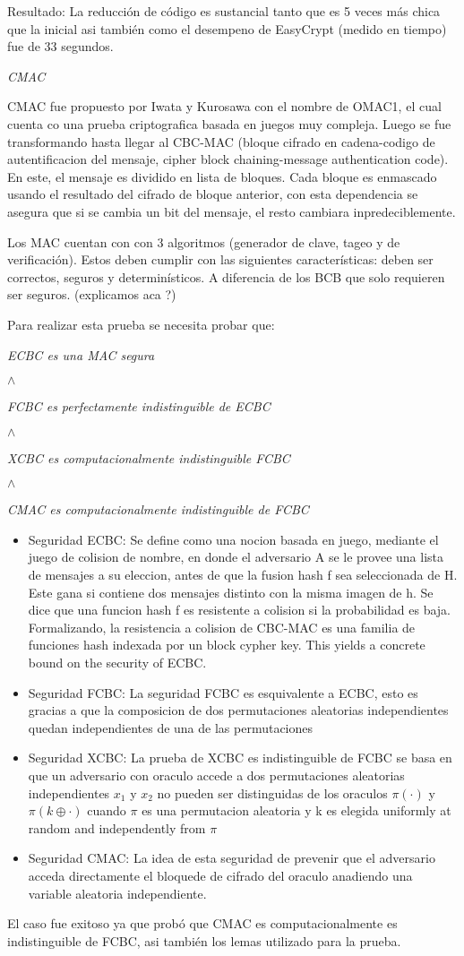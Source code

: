\documentclass[runningheads,a4paper]{llncs}
\begin{document}
Resultado: La reducción de código es sustancial tanto que es 5 veces más chica que la inicial asi también como el desempeno de EasyCrypt (medido en tiempo) fue de 33 segundos.\cite{article3}



\centerline{\emph{CMAC}}
\cite{article5}
CMAC fue propuesto por Iwata y Kurosawa con el nombre de OMAC1, el cual cuenta co una prueba criptografica basada en juegos muy compleja. Luego se fue transformando hasta llegar al CBC-MAC (bloque cifrado en cadena-codigo de autentificacion del mensaje, cipher block chaining-message authentication code). En este, el mensaje es dividido en lista de bloques. Cada bloque es enmascado usando el resultado del cifrado de bloque anterior, con esta dependencia se asegura que si se cambia un bit  del mensaje, el resto cambiara inpredeciblemente.

Los MAC cuentan con con 3 algoritmos (generador de clave, tageo y de verificación). Estos deben cumplir con las siguientes características: deben ser correctos, seguros y determinísticos. A diferencia de los BCB que solo requieren ser seguros. (explicamos aca ?)

Para realizar esta prueba se necesita probar que:

\centerline{\emph{ECBC es una MAC segura}}
\centerline{$\land$}
\centerline{\emph{FCBC es perfectamente indistinguible de ECBC}}
\centerline{$\land$}
\centerline{\emph{XCBC es computacionalmente indistinguible FCBC}}
\centerline{$\land$}
\centerline{\emph{CMAC es computacionalmente indistinguible de FCBC}}

\begin{itemize}
	\item Seguridad ECBC: Se define como una nocion basada en juego, mediante el juego de colision de nombre, en donde el adversario A se le provee una lista de mensajes a su eleccion, antes de que la fusion hash f sea seleccionada de H. Este gana si contiene dos mensajes distinto con la misma imagen de h. Se dice que una funcion hash f es resistente a colision si la probabilidad es baja. Formalizando, la resistencia a colision de CBC-MAC es una familia de funciones hash indexada por un block cypher key. This yields a concrete bound on the security of ECBC.
	\item Seguridad FCBC: La seguridad FCBC es esquivalente a ECBC, esto es gracias a que la composicion de dos permutaciones aleatorias independientes quedan independientes de una de las permutaciones 
	\item Seguridad XCBC: La prueba de XCBC es indistinguible de FCBC se basa en que un adversario con oraculo accede a dos permutaciones aleatorias independientes $x_1$ y $x_2$ no pueden ser distinguidas de los oraculos $\pi (\cdot)$ y $\pi (k \oplus \cdot)$ cuando $\pi$ es una permutacion aleatoria y k es elegida uniformly at
random and independently from $\pi$
	\item Seguridad CMAC: La idea de esta seguridad de prevenir que el adversario acceda directamente el bloquede de cifrado del oraculo anadiendo una variable aleatoria independiente.
\end{itemize}
El caso fue exitoso ya que probó que CMAC es computacionalmente es indistinguible de FCBC, asi también los lemas utilizado para la prueba.
\end{document}
